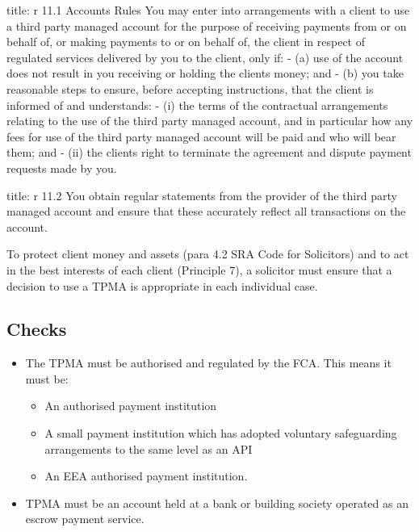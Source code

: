 \documentclass[
]{article}
\newenvironment{Shaded}{}{}
\newcommand{\NormalTok}[1]{#1}
\providecommand{\tightlist}{%
  \setlength{\itemsep}{0pt}\setlength{\parskip}{0pt}}
\begin{document}
\begin{Shaded}
\begin{Highlighting}[]
\NormalTok{title: r 11.1 Accounts\textquotesingle{} Rules}
\NormalTok{You may enter into arrangements with a client to use a third party managed account for the purpose of receiving payments from or on behalf of, or making payments to or on behalf of, the client in respect of regulated services delivered by you to the client, only if:}
\NormalTok{{-} (a) use of the account does not result in you receiving or holding the client\textquotesingle{}s money; and}
\NormalTok{{-} (b) you take reasonable steps to ensure, before accepting instructions, that the client is informed of and understands:}
\NormalTok{    {-} (i) the terms of the contractual arrangements relating to the use of the third party managed account, and in particular how any fees for use of the third party managed account will be paid and who will bear them; and}
\NormalTok{    {-} (ii) the client\textquotesingle{}s right to terminate the agreement and dispute payment requests made by you.}
\end{Highlighting}
\end{Shaded}

\begin{Shaded}
\begin{Highlighting}[]
\NormalTok{title: r 11.2}
\NormalTok{You obtain regular statements from the provider of the third party managed account and ensure that these accurately reflect all transactions on the account.}
\end{Highlighting}
\end{Shaded}

To protect client money and assets (para 4.2 SRA Code for Solicitors)
and to act in the best interests of each client (Principle 7), a
solicitor must ensure that a decision to use a TPMA is appropriate in
each individual case.

\hypertarget{checks}{%
\subsection{Checks}\label{checks}}

\begin{itemize}
\tightlist
\item
  The TPMA must be authorised and regulated by the FCA. This means it
  must be:

  \begin{itemize}
  \tightlist
  \item
    An authorised payment institution
  \item
    A small payment institution which has adopted voluntary safeguarding
    arrangements to the same level as an API
  \item
    An EEA authorised payment institution.
  \end{itemize}
\item
  TPMA must be an account held at a bank or building society operated as
  an escrow payment service.
\end{itemize}
\end{document}
